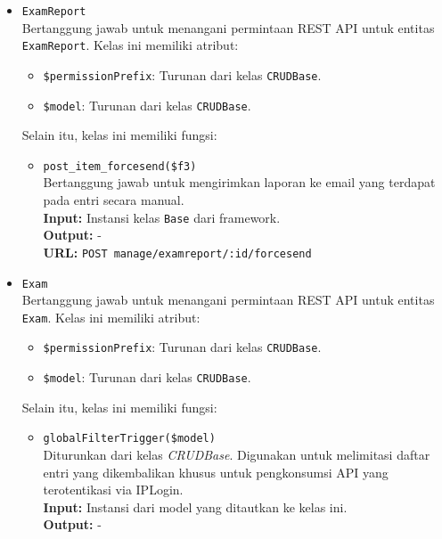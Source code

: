 \begin{itemize}
        \item \texttt{ExamReport}\\
            Bertanggung jawab untuk menangani permintaan REST API untuk entitas
            \texttt{ExamReport}. Kelas ini memiliki atribut:
            \begin{itemize}
                \item \texttt{\$permissionPrefix}: Turunan dari kelas
                \texttt{CRUDBase}.
                \item \texttt{\$model}: Turunan dari kelas \texttt{CRUDBase}.
            \end{itemize}
            Selain itu, kelas ini memiliki fungsi:
            \begin{itemize}
                \item \texttt{post\_item\_forcesend(\$f3)} \\
                    Bertanggung jawab untuk mengirimkan laporan ke email yang
                    terdapat pada entri secara manual.\\
                    \textbf{Input:} Instansi kelas \texttt{Base} dari
                    framework.\\
                    \textbf{Output:} -\\
                    \textbf{URL:} \texttt{POST manage/examreport/:id/forcesend}
            \end{itemize}
        
        \item \texttt{Exam}\\
            Bertanggung jawab untuk menangani permintaan REST API untuk entitas
            \texttt{Exam}. Kelas ini memiliki atribut:
            \begin{itemize}
                \item \texttt{\$permissionPrefix}: Turunan dari kelas
                \texttt{CRUDBase}.
                \item \texttt{\$model}: Turunan dari kelas \texttt{CRUDBase}.
            \end{itemize}
            Selain itu, kelas ini memiliki fungsi:
            \begin{itemize}
                \item \texttt{globalFilterTrigger(\$model)} \\
                    Diturunkan dari kelas \textit{CRUDBase}. Digunakan untuk
                    melimitasi daftar entri yang dikembalikan khusus untuk
                    pengkonsumsi API yang terotentikasi via IPLogin. \\
                    \textbf{Input:} Instansi dari model yang ditautkan ke kelas
                    ini.\\
                    \textbf{Output:} -
                

\end{itemize}
\end{itemize}
